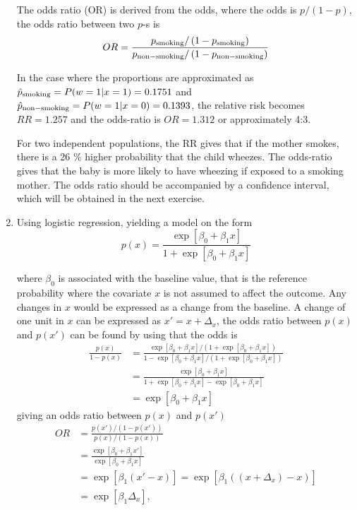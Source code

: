 \documentclass[a4paper,11pt]{article}
\begin{document}
\begin{enumerate}[label=\alph*)]
        The odds ratio (OR) is derived from the odds, where the odds is $p/(1-p)$, the odds ratio between two $p$-s is
        \begin{equation}
            OR = \frac{p_{\rm smoking} / \left( 1-p_{\rm smoking} \right)}{p_{\rm non-smoking} / \left( 1-p_{\rm non-smoking} \right)}
            \label{eq:OR}
        \end{equation}

        In the case where the proportions are approximated as $\hat{p}_{\rm smoking} = P(w=1 | x=1 ) = 0.1751$ and $\hat{p}_{\rm non-smoking} = P(w=1 | x=0) = 0.1393$, the relative risk becomes $RR = 1.257$ and the odds-ratio is $OR = 1.312$ or approximately 4:3. 

        For two independent populations, the RR gives that if the mother smokes, there is a 26 \% higher probability that the child wheezes. The odds-ratio gives that the baby is more likely to have wheezing if exposed to a smoking mother. The odds ratio should be accompanied by a confidence interval, which will be obtained in the next exercise. 

    \item Using logistic regression, yielding a model on the form
        \begin{equation}
            p(x) = \frac{\exp\left[ \beta_0 + \beta_1 x \right]}{1 + \exp\left[ \beta_0 + \beta_1 x \right]}
            \label{eq:logit}
        \end{equation}

        where $\beta_0$ is associated with the baseline value, that is the reference probability where the covariate $x$ is not assumed to affect the outcome. Any changes in $x$ would be expressed as a change from the baseline. A change of one unit in $x$ can be expressed as $x' = x + \Delta_x$, the odds ratio between $p(x)$ and $p(x')$ can be found by using that the odds is 
        \begin{align*}
            \frac{p(x)}{1 - p(x)} &= \frac{\exp\left[ \beta_0 + \beta_1 x \right] / \left( 1 + \exp\left[ \beta_0 + \beta_1 x \right] \right)}{1 - \exp\left[ \beta_0 + \beta_1 x \right]/\left( 1 + \exp\left[ \beta_0 + \beta_1 x \right] \right)} \\
            &= \frac{\exp\left[ \beta_0 + \beta_1 x \right]}{1 + \exp\left[ \beta_0 + \beta_1 x \right] - \exp\left[ \beta_0 + \beta_1 x \right]} \\
            &= \exp\left[ \beta_0 + \beta_1 x \right]
        \end{align*}
        giving an odds ratio between $p(x)$ and $p(x')$
        \begin{align*}
            OR &= \frac{p(x')/\left( 1 - p(x') \right)}{p(x)/\left( 1-p(x) \right)} \\
            &= \frac{\exp\left[ \beta_0 + \beta_1 x' \right]}{\exp\left[ \beta_0 + \beta_1 x \right]} \\
            &= \exp\left[ \beta_1 \left( x' - x \right) \right] = \exp\left[ \beta_1 \left( (x + \Delta_x) - x \right) \right] \\
            &= \exp\left[ \beta_1 \Delta_x \right],
        \end{align*}


\end{enumerate}
\end{document}
